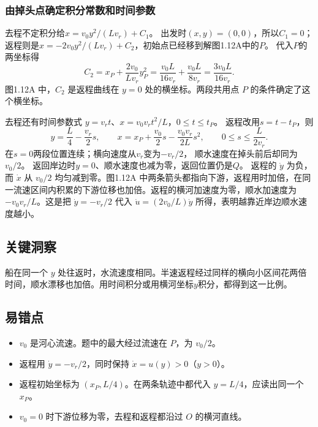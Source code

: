 \documentclass[UTF8,fontset=fandol,a4paper,11pt]{ctexart}
\begin{document}
\subsubsection*{由掉头点确定积分常数和时间参数}
去程不定积分给$x=v_0y^2/(Lv_r)+C_1$。
出发时$(x,y)=(0,0)$，所以$C_1=0$；
返程则是$x=-2v_0y^2/(Lv_r)+C_2$，初始点已经移到解图1.12A中的$P$。
代入$P$的两坐标得
\[
C_2=x_P+\frac{2v_0}{Lv_r}y_P^2
=\frac{v_0L}{16v_r}+\frac{v_0L}{8v_r}
=\frac{3v_0L}{16v_r}.
\]
图1.12A 中，$C_2$ 是返程曲线在 $y=0$ 处的横坐标。两段共用点 $P$ 的条件确定了这个横坐标。

去程还有时间参数式
$y=v_rt$、$x=v_0v_rt^2/L$，$0\leq t\leq t_P$。
返程改用$s=t-t_P$，则
\[
y=\frac L4-\frac{v_r}{2}s,\qquad
x=x_P+\frac{v_0}{2}s-\frac{v_0v_r}{2L}s^2,
\qquad 0\leq s\leq\frac{L}{2v_r}.
\]
在$s=0$两段位置连续；横向速度从$v_r$变为$-v_r/2$，
顺水速度在掉头前后却同为$v_0/2$。
返回岸边时$y=0$、顺水速度也减为零，返回位置仍是$Q$。
返程的 $\dot y$ 为负，而 $\dot x$ 从 $v_0/2$ 均匀减到零。图1.12A 中两条箭头都指向下游，返程用时加倍，在同一流速区间内积累的下游位移也加倍。返程的横河加速度为零，顺水加速度为 $-v_0v_r/L$。这是把 $\dot y=-v_r/2$ 代入 $\dot u=(2v_0/L)\dot y$ 所得，表明越靠近岸边顺水速度越小。




\subsection*{关键洞察}

船在同一个 $y$ 处往返时，水流速度相同。半速返程经过同样的横向小区间花两倍时间，顺水漂移也加倍。用时间积分或用横河坐标$y$积分，都得到这一比例。



\subsection*{易错点}

\begin{itemize}
\item $v_0$ 是河心流速。题中的最大经过流速在 $P$，为 $v_0/2$。
\item 返程用 $\dot y=-v_r/2$，同时保持 $\dot x=u(y)>0$（$y>0$）。
\item 返程初始坐标为 $(x_P,L/4)$。在两条轨迹中都代入 $y=L/4$，应读出同一个 $x_P$。
\item $v_0=0$ 时下游位移为零，去程和返程都沿过 $O$ 的横河直线。
\end{itemize}
\end{document}
